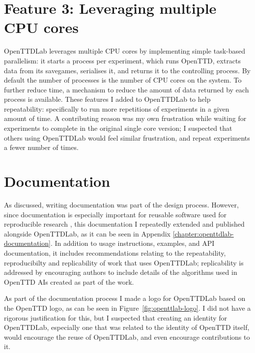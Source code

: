 \documentclass[logo,msc,dsti]{style/infthesis}    %
\begin{document}
{\section{Feature 3: Leveraging multiple CPU cores}

OpenTTDLab leverages multiple CPU cores by implementing simple task-based parallelism: it starts a process per experiment, which runs OpenTTD, extracts data from its savegames, serialises it, and returns it to the controlling process. By default the number of processes is the number of CPU cores on the system. To further reduce time, a mechanism to reduce the amount of data returned by each process is available. These features I added to OpenTTDLab to help repeatability: specifically to run more repetitions of experiments in a given amount of time. A contributing reason was my own frustration while waiting for experiments to complete in the original single core version; I suspected that others using OpenTTDLab would feel similar frustration, and repeat experiments a fewer number of times.

\section{Documentation}

As discussed, writing documentation was part of the design process. However, since documentation is especially important for reusable software used for reproducible research \cite{turingway2022}, this documentation I repeatedly extended and published alongside OpenTTDLab, as it can be seen in Appendix \ref{chapter:openttdlab-documentation}. In addition to usage instructions, examples, and API documentation, it includes recommendations relating to the repeatability, reproducibilty and replicability of work that uses OpenTTDLab; replicability is addressed by encouraging authors to include details of the algorithms used in OpenTTD AIs created as part of the work.

As part of the documentation process I made a logo for OpenTTDLab based on the OpenTTD logo, as can be seen in Figure~\ref{fig:openttlab-logo}. I did not have a rigorous justification for this, but I suspected that creating an identity for OpenTTDLab, especially one that was related to the identity of OpenTTD itself, would encourage the reuse of OpenTTDLab, and even encourage contributions to it.


}
\end{document}
